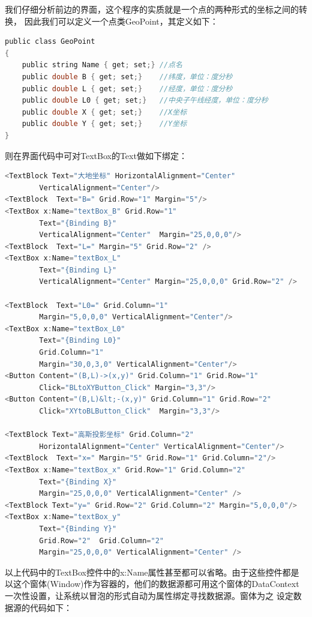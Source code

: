 我们仔细分析前边的界面，这个程序的实质就是一个点的两种形式的坐标之间的转换，
因此我们可以定义一个点类GeoPoint，其定义如下：

\begin{lstlisting}[language=C]
public class GeoPoint
{
    public string Name { get; set;} //点名
    public double B { get; set;}    //纬度，单位：度分秒
    public double L { get; set;}    //经度，单位：度分秒
    public double L0 { get; set;}   //中央子午线经度，单位：度分秒
    public double X { get; set;}    //X坐标
    public double Y { get; set;}    //Y坐标
}
\end{lstlisting}

则在界面代码中可对TextBox的Text做如下绑定：

\begin{lstlisting}[language=C]
<TextBlock Text="大地坐标" HorizontalAlignment="Center"
        VerticalAlignment="Center"/>
<TextBlock  Text="B=" Grid.Row="1" Margin="5"/>
<TextBox x:Name="textBox_B" Grid.Row="1"
        Text="{Binding B}"
        VerticalAlignment="Center"  Margin="25,0,0,0"/>
<TextBlock  Text="L=" Margin="5" Grid.Row="2" />
<TextBox x:Name="textBox_L"
        Text="{Binding L}"
        VerticalAlignment="Center" Margin="25,0,0,0" Grid.Row="2" />

<TextBlock  Text="L0=" Grid.Column="1"
        Margin="5,0,0,0" VerticalAlignment="Center"/>
<TextBox x:Name="textBox_L0"
        Text="{Binding L0}" 
        Grid.Column="1"
        Margin="30,0,3,0" VerticalAlignment="Center"/>
<Button Content="(B,L)->(x,y)" Grid.Column="1" Grid.Row="1"
        Click="BLtoXYButton_Click" Margin="3,3"/>
<Button Content="(B,L)&lt;-(x,y)" Grid.Column="1" Grid.Row="2"
        Click="XYtoBLButton_Click"  Margin="3,3"/>
        
<TextBlock Text="高斯投影坐标" Grid.Column="2"
        HorizontalAlignment="Center" VerticalAlignment="Center"/>
<TextBlock  Text="x=" Margin="5" Grid.Row="1" Grid.Column="2"/>
<TextBox x:Name="textBox_x" Grid.Row="1" Grid.Column="2"
        Text="{Binding X}"
        Margin="25,0,0,0" VerticalAlignment="Center" />
<TextBlock Text="y=" Grid.Row="2" Grid.Column="2" Margin="5,0,0,0"/>
<TextBox x:Name="textBox_y"
        Text="{Binding Y}"
        Grid.Row="2"  Grid.Column="2"
        Margin="25,0,0,0" VerticalAlignment="Center" />  
\end{lstlisting}

以上代码中的TextBox控件中的x:Name属性甚至都可以省略。由于这些控件都是
以这个窗体(Window)作为容器的，他们的数据源都可用这个窗体的DataContext
一次性设置，让系统以冒泡的形式自动为属性绑定寻找数据源。窗体为之
设定数据源的代码如下：

